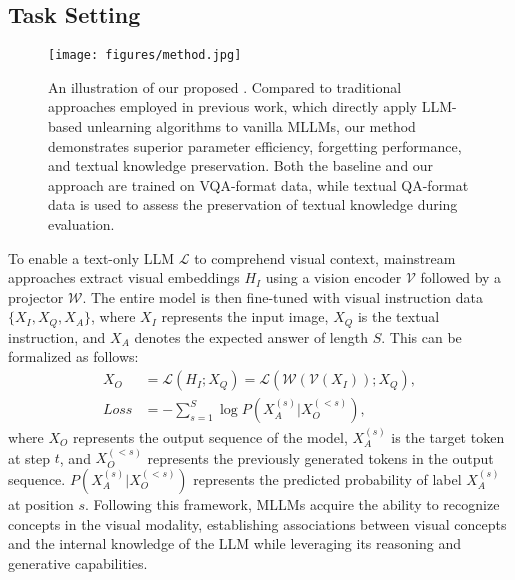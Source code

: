 \subsection{Task Setting}\label{sec:task}
\begin{figure*}[thp]
\centering
\texttt{[image: figures/method.jpg]}
\caption{An illustration of our proposed \method. Compared to traditional approaches employed in previous work, which directly apply LLM-based unlearning algorithms to vanilla MLLMs, our method demonstrates superior parameter efficiency, forgetting performance, and textual knowledge preservation. Both the baseline and our approach are trained on VQA-format data, while textual QA-format data is used to assess the preservation of textual knowledge during evaluation.}
\label{fig:method}
\end{figure*}
To enable a text-only LLM $\mathcal{L}$ to comprehend visual context, mainstream approaches extract visual embeddings $H_I$ using a vision encoder $\mathcal{V}$ followed by a projector $\mathcal{W}$. The entire model is then fine-tuned with visual instruction data $\{X_I, X_Q, X_A\}$, where $X_I$ represents the input image, $X_Q$ is the textual instruction, and $X_A$ denotes the expected answer of length $S$. This can be formalized as follows:
\begin{equation}\label{eq:train}
\begin{split}
    X_O &= \mathcal{L}(H_I; X_Q) = \mathcal{L}(\mathcal{W}(\mathcal{V}(X_I)); X_Q),\\
    {Loss} &= - \sum_{s=1}^{S} \log P(X_A^{(s)} | X_O^{(<s)}),
\end{split}
\end{equation}
where $X_O$ represents the output sequence of the model, $X_A^{(s)}$ is the target token at step $t$, and $X_O^{(<s)}$ represents the previously generated tokens in the output sequence. $P(X_A^{(s)} | X_O^{(<s)})$ represents the predicted probability of label $X_A^{(s)}$ at position $s$. Following this framework, MLLMs acquire the ability to recognize concepts in the visual modality, establishing associations between visual concepts and the internal knowledge of the LLM while leveraging its reasoning and generative capabilities.

